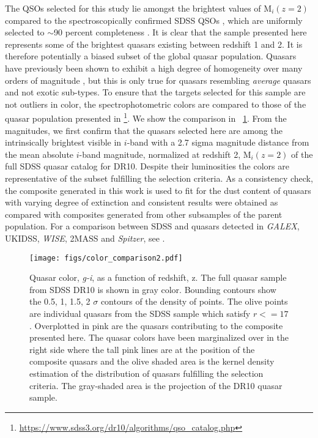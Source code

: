 \documentclass{aa}    %
\newcommand{\figref}[1]{\ref{fig:#1}}
\newcommand{\Fig}[1]{\figurename~\figref{#1}}
\newcommand{\fig}[1]{\Fig{#1}}
\newcommand{\figlabel}[1]{\label{fig:#1}}
\begin{document}
The QSOs selected for this study lie amongst the brightest values of
M$_i(z=2)$ compared to the spectroscopically confirmed SDSS QSOs
\citep{Shen2011}, which are uniformly selected to $\sim$90 percent
completeness \citep{Richards2002, VandenBerk2005}. It is clear that
the sample presented here represents some of the brightest quasars
existing between redshift 1 and 2. It is therefore potentially a
biased subset of the global quasar population. Quasars have previously
been shown to exhibit a high degree of homogeneity over many orders
of magnitude \citep{Dietrich2002}, but this is only true for quasars
resembling \textit{average} quasars and not exotic sub-types. To
ensure that the targets selected for this sample are not outliers in
color, the spectrophotometric colors are compared to those of the
quasar population presented in
\citet{Paris2014}\footnote{\url{https://www.sdss3.org/dr10/algorithms/qso_catalog.php}}.
We
show the comparison in \fig{color_comparison}. From the magnitudes, we
first confirm that the quasars selected here are among the
intrinsically brightest visible in $i$-band with a 2.7 sigma magnitude
distance from the mean absolute $i$-band magnitude, normalized at redshift 2,
M$_i(z=2)$ of the full SDSS quasar catalog for DR10. Despite their luminosities the colors are representative
of the subset fulfilling the selection criteria. As a consistency
check, the composite generated in this work is used to fit for the
dust content of quasars with varying degree of extinction and
consistent results were obtained as compared with composites generated
from other subsamples of the parent population. For a comparison
between SDSS and quasars detected in \textit{GALEX}, UKIDSS,
\textit{WISE}, 2MASS and \textit{Spitzer}, see
\citet{Krawczyk2013}.


 \begin{figure}[t!]
   \centering
   \texttt{[image: figs/color\_comparison2.pdf]}
   \caption[]{Quasar color, \textit{g-i},  as a function of redshift, z. The
full quasar sample from SDSS DR10 \citep{Paris2014} is shown in gray color.
Bounding contours show the 0.5, 1, 1.5, 2 $\sigma$ contours of the density of
points. The olive points are individual quasars from the SDSS sample which
satisfy $r <= 17$. Overplotted in pink are the quasars contributing to the
composite presented here. The quasar colors have been marginalized over in the
right side where the tall pink lines are at the position of the composite
quasars and the olive shaded area is the kernel density estimation of the
distribution of quasars fulfilling the selection criteria. The gray-shaded area
is the projection of the DR10 quasar sample.}
  \figlabel{color_comparison}
 \end{figure}
\end{document}
